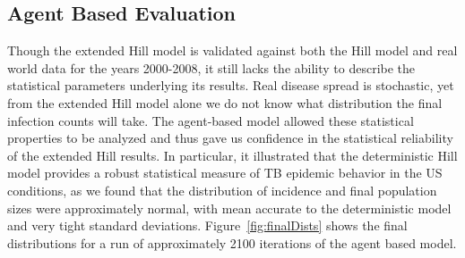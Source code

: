 \documentclass{amsart}
\renewcommand{\(}{\left(}
\renewcommand{\)}{\right)}
\begin{document}
\subsection{Agent Based Evaluation}
Though the extended Hill model is validated against both the Hill model and real
world data for the years 2000-2008, it still lacks the ability to describe the
statistical parameters underlying its results. Real disease spread is
stochastic, yet from the extended Hill model alone we do not know what
distribution the final infection counts will take. The agent-based model allowed
these statistical properties to be analyzed and thus gave us confidence in the
statistical reliability of the extended Hill results. In particular, it
illustrated that the deterministic Hill model provides a robust statistical
measure of TB epidemic behavior in the US conditions, as we found that the
distribution of incidence and final population sizes were approximately
normal, with mean accurate to the deterministic model and very tight standard
deviations. Figure~\ref{fig:finalDists} shows the final distributions for a run
of approximately 2100 iterations of the agent based model. 
\end{document}

